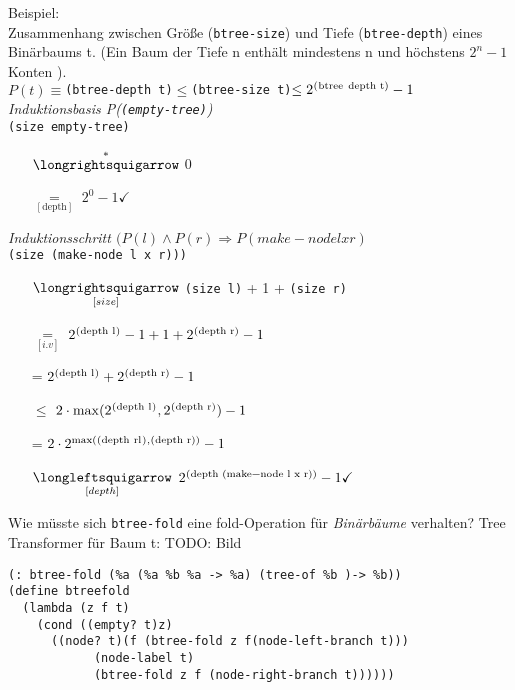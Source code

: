 Beispiel:\\
Zusammenhang zwischen Grö\ss e (\lstinline|btree-size|) und Tiefe (\lstinline|btree-depth|) eines Binärbaums t. (\glqq Ein Baum der Tiefe n enthält mindestens n und höchstens $2^n-1$ Konten \grqq).\\
$P(t) \equiv $\lstinline|(btree-depth t)|$\le$\lstinline|(btree-size t)|$\le 2^{\text{\lstinline|(btree depth t)|}}-1$\\
\emph{Induktionsbasis P(\lstinline|(empty-tree)|)}\\
\lstinline|(size empty-tree)|
\begin{enumerate}
\item[$\overset{*}{\text{\eval}}$]0
\item[$\underset{[\text{depth}]}{=}$] $2^0 -1 \checkmark$
\end{enumerate}
\emph{Induktionsschritt $(P(l) \land P(r) \Rightarrow P(make-node l x r)$}\\
\lstinline|(size (make-node l x r)))|
\begin{enumerate}
\item[$\underset{[size]}{\text{\eval}}$] \lstinline|(size l)| + 1 + \lstinline|(size r)|
\item[$\underset{[i.v]}{=}$] $2^{\text{\lstinline|(depth l)|}} - 1 + 1 + 2^{\text{\lstinline|(depth r)|}} - 1$
\item[=] $2^{\text{\lstinline|(depth l)|}} + 2^{\text{\lstinline|(depth r)|}} - 1$
\item[$\le$] $2 \cdot \max(2^{\text{\lstinline|(depth l)|}},2^{\text{\lstinline|(depth r)|}})-1$
\item[=] $2 \cdot 2^{\max(\text{\lstinline|(depth rl)|},\text{\lstinline|(depth r)|})}-1$
\item[$\underset{[depth]}{\text{\reval}}$] $2^{\text{\lstinline|(depth (make-node l x r))|}}-1 \checkmark$
\end{enumerate}
Wie müsste sich \lstinline|btree-fold| eine fold-Operation für \emph{Binärbäume} verhalten? Tree Transformer für Baum t:
TODO: Bild\\
\begin{lstlisting}
(: btree-fold (%a (%a %b %a -> %a) (tree-of %b )-> %b))
(define btreefold
  (lambda (z f t)
    (cond ((empty? t)z)
	  ((node? t)(f (btree-fold z f(node-left-branch t)))
		    (node-label t)
		    (btree-fold z f (node-right-branch t))))))
\end{lstlisting}